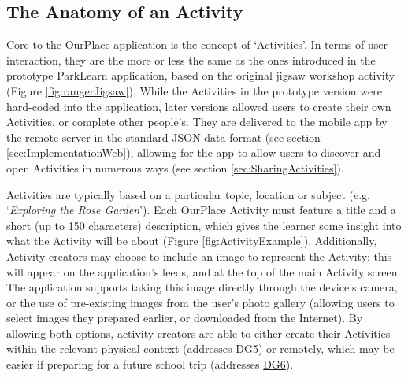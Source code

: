 \subsection{The Anatomy of an Activity}
\label{sec:ActivityOverview}
Core to the OurPlace application is the concept of `Activities'. In terms of user interaction, they are the more or less the same as the ones introduced in the prototype ParkLearn application, based on the original jigsaw workshop activity (Figure \ref{fig:rangerJigsaw}). While the Activities in the prototype version were hard-coded into the application, later versions allowed users to create their own Activities, or complete other people's. They are delivered to the mobile app by the remote server in the standard JSON data format (see section \ref{sec:ImplementationWeb}), allowing for the app to allow users to discover and open Activities in numerous ways (see section \ref{sec:SharingActivities}).

Activities are typically based on a particular topic, location or subject (e.g. `\textit{Exploring the Rose Garden}'). Each OurPlace Activity must feature a title and a short (up to 150 characters) description, which gives the learner some insight into what the Activity will be about (Figure \ref{fig:ActivityExample}). Additionally, Activity creators may choose to include an image to represent the Activity: this will appear on the application's feeds, and at the top of the main Activity screen. The application supports taking this image directly through the device's camera, or the use of pre-existing images from the user's photo gallery (allowing users to select images they prepared earlier, or downloaded from the Internet). By allowing both options, activity creators are able to either create their Activities within the relevant physical context (addresses \hyperref[DG5]{DG5}) or remotely, which may be easier if preparing for a future school trip (addresses \hyperref[DG6]{DG6}).

